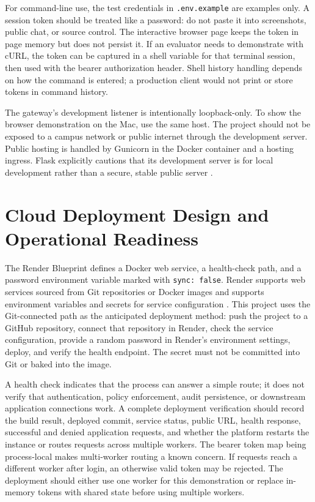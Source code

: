 For command-line use, the test credentials in \texttt{.env.example} are examples only. A session token should be treated like a password: do not paste it into screenshots, public chat, or source control. The interactive browser page keeps the token in page memory but does not persist it. If an evaluator needs to demonstrate with cURL, the token can be captured in a shell variable for that terminal session, then used with the bearer authorization header. Shell history handling depends on how the command is entered; a production client would not print or store tokens in command history.

The gateway's development listener is intentionally loopback-only. To show the browser demonstration on the Mac, use the same host. The project should not be exposed to a campus network or public internet through the development server. Public hosting is handled by Gunicorn in the Docker container and a hosting ingress. Flask explicitly cautions that its development server is for local development rather than a secure, stable public server \cite{flaskDeploy}.

\section{Cloud Deployment Design and Operational Readiness}
The Render Blueprint defines a Docker web service, a health-check path, and a password environment variable marked with \texttt{sync: false}. Render supports web services sourced from Git repositories or Docker images and supports environment variables and secrets for service configuration \cite{renderWeb,renderEnv}. This project uses the Git-connected path as the anticipated deployment method: push the project to a GitHub repository, connect that repository in Render, check the service configuration, provide a random password in Render's environment settings, deploy, and verify the health endpoint. The secret must not be committed into Git or baked into the image.

A health check indicates that the process can answer a simple route; it does not verify that authentication, policy enforcement, audit persistence, or downstream application connections work. A complete deployment verification should record the build result, deployed commit, service status, public URL, health response, successful and denied application requests, and whether the platform restarts the instance or routes requests across multiple workers. The bearer token map being process-local makes multi-worker routing a known concern. If requests reach a different worker after login, an otherwise valid token may be rejected. The deployment should either use one worker for this demonstration or replace in-memory tokens with shared state before using multiple workers.

